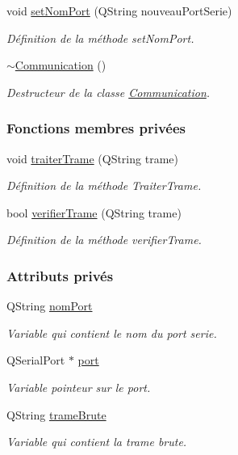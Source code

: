 \begin{DoxyCompactItemize}
void \hyperlink{class_communication_a06a0f05f4555c6e3586e1800bbaa5e13}{set\+Nom\+Port} (Q\+String nouveau\+Port\+Serie)
\begin{DoxyCompactList}\small\item\em Définition de la méthode set\+Nom\+Port. \end{DoxyCompactList}\item 
\hyperlink{class_communication_a75ba08ce908d45251e28e4c1db94e6f4}{$\sim$\+Communication} ()
\begin{DoxyCompactList}\small\item\em Destructeur de la classe \hyperlink{class_communication}{Communication}. \end{DoxyCompactList}\end{DoxyCompactItemize}
\subsubsection*{Fonctions membres privées}
\begin{DoxyCompactItemize}
\item 
void \hyperlink{class_communication_ab4ff84d0fb69ffa990bc61939c95a093}{traiter\+Trame} (Q\+String trame)
\begin{DoxyCompactList}\small\item\em Définition de la méthode Traiter\+Trame. \end{DoxyCompactList}\item 
bool \hyperlink{class_communication_a3958c8f275ff8d50dca85afe65c795d1}{verifier\+Trame} (Q\+String trame)
\begin{DoxyCompactList}\small\item\em Définition de la méthode verifier\+Trame. \end{DoxyCompactList}\end{DoxyCompactItemize}
\subsubsection*{Attributs privés}
\begin{DoxyCompactItemize}
\item 
Q\+String \hyperlink{class_communication_a5fa89ee1fc732871f3f8f177fb50bf2a}{nom\+Port}
\begin{DoxyCompactList}\small\item\em Variable qui contient le nom du port serie. \end{DoxyCompactList}\item 
Q\+Serial\+Port $\ast$ \hyperlink{class_communication_aff7d55208f31232fbdc1dcec488908f1}{port}
\begin{DoxyCompactList}\small\item\em Variable pointeur sur le port. \end{DoxyCompactList}\item 
Q\+String \hyperlink{class_communication_a7a55775be5e16249315fe5faef4f13b4}{trame\+Brute}
\begin{DoxyCompactList}\small\item\em Variable qui contient la trame brute. \end{DoxyCompactList}\end{DoxyCompactItemize}


